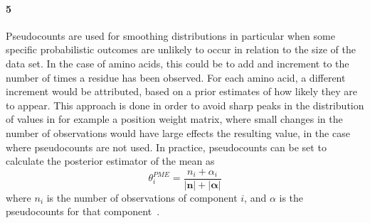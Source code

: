 \documentclass[11pt]{article}\usepackage[]{graphicx}\usepackage[]{color}
\theoremstyle{plain}
\begin{document}
\begin{multicols*}{2}
\paragraph{5}
Pseudocounts are used for smoothing distributions in particular when some specific probabilistic outcomes are unlikely to occur in relation to the size of the data set. In the case of amino acids, this could be to add and increment to the number of times a residue has been observed. For each amino acid, a different increment would be attributed, based on a prior estimates of how likely they are to appear. This approach is done in order to avoid sharp peaks in the distribution of values in for example a position weight matrix, where small changes in the number of observations would have large effects the resulting value, in the case where pseudocounts are not used. In practice, pseudocounts can be set to calculate the posterior estimator of the mean as
$$
\theta^{PME}_i = \dfrac{n_i + \alpha_i}{|\mathbf n| + |\mathbf \alpha |}
$$
where $n_i$ is the number of observations of component $i$, and $\alpha$ is the pseudocounts for that component~\cite{durbin1998biological}.




\end{multicols*}
\end{document}
